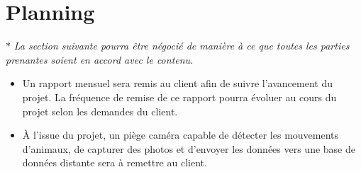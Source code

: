 \section{Planning}

$ \ast $ \textit{La section suivante pourra être négocié de manière à ce que toutes les parties prenantes soient en accord avec le contenu.} \\

\begin{itemize}
   \item Un rapport mensuel sera remis au client afin de suivre l'avancement du projet. La fréquence de remise de ce rapport pourra évoluer au cours du projet selon les demandes du client.
   \item À l’issue du projet, un piège caméra capable de détecter les mouvements d’animaux, de capturer des photos et d’envoyer les données vers une base de données distante sera à remettre au client.
\end{itemize}